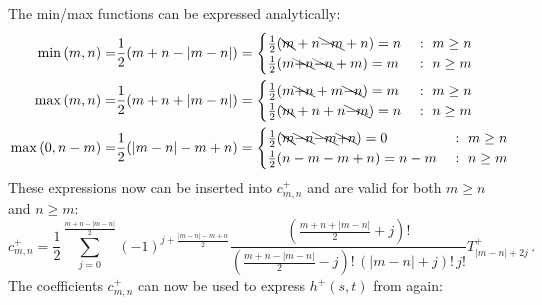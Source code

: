 The min/max functions can be expressed analytically:
\begin{align}
  \mathrm{min}\,(m,n)
  =& \frac{1}{2} (m+n-|m-n|) = \begin{cases}
                                 \frac{1}{2} (\bcancel{m}+n\bcancel{-m}+n) = n & ~:~ m \geq n \\
                                 \frac{1}{2} (m\bcancel{+n}\bcancel{-n}+m) = m & ~:~ n \geq m
                               \end{cases} \\
  \mathrm{max}\,(m,n)
  =& \frac{1}{2} (m+n+|m-n|) = \begin{cases}
                                 \frac{1}{2} (m\bcancel{+n}+m\bcancel{-n}) = m & ~:~ m \geq n \\
                                 \frac{1}{2} (\bcancel{m}+n+n\bcancel{-m}) = n & ~:~ n \geq m
                               \end{cases} \\
  \mathrm{max}\,(0,n-m)
  =& \frac{1}{2} (|m-n|-m+n) = \begin{cases}
                                 \frac{1}{2} (\bcancel{m}\bcancel{-n}\bcancel{-m}\bcancel{+n}) = 0 & ~:~ m \geq n \\
                                 \frac{1}{2} (n-m-m+n) = n-m & ~:~ n \geq m
                               \end{cases}
\end{align}
These expressions now can be inserted into $c^{+}_{m,n}$ and are valid for both $m \geq n$ and $n \geq m$:
\begin{equation}
    c^{+}_{m,n}
  = \frac{1}{2}
    \sum\limits_{j=0}^{\frac{m+n-|m-n|}{2}}
      (-1)^{j+\frac{|m-n|-m+n}{2}}
      \frac{\left(\frac{m+n+|m-n|}{2} +j \right)!}
           {\left(\frac{m+n-|m-n|}{2} -j \right)!\, (|m-n|+j)!\, j!}
      T^{+}_{|m-n|+2j} \, . \label{eqn:c_p_mn}
\end{equation}
The coefficients $c^{+}_{m,n}$ can now be used to express $h^{+}(s,t)$ from  again:
